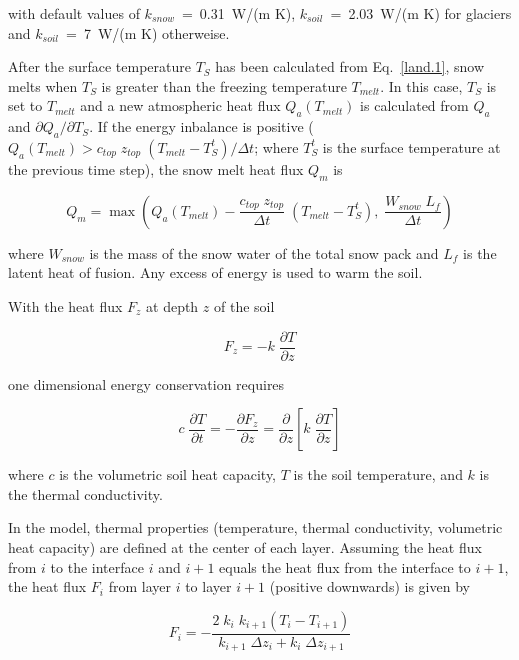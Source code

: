 with default values of $k_{snow}$~=~0.31~W/(m K),
$k_{soil}$~=~2.03~W/(m K) for
glaciers and   $k_{soil}$~=~7~W/(m K) otherweise.
 
After the surface temperature $T_S$ has been
calculated
from Eq.~\ref{land.1}, snow melts when $T_S$ is
greater than the freezing temperature $T_{melt}$. In this
case,  $T_S$ is set to $T_{melt}$ and a new atmospheric
heat
flux $Q_a(T_{melt})$ is calculated from  $Q_a$ and
$\partial Q_a/\partial T_S$. If  the energy inbalance is
positive ($Q_a(T_{melt}) >  c_{top} \; z_{top}\;  (T_{melt} -
T_S^{t})/\Delta t$; where $T_S^{t}$ is the surface
temperature at
the previous time step),  the  
snow melt heat flux $Q_m$ is

\begin{equation}\label{melt}
Q_m=\max(Q_a(T_{melt}) - \frac{c_{top} \; z_{top}}{\Delta
t} \; (T_{melt} - T_S^{t}), \; \frac{W_{snow} \; L_f}{\Delta t})
\end{equation}

where $W_{snow}$ is the mass of the snow water of
the
total snow pack and $L_f$ is the latent heat of fusion. 
Any excess of energy is used to warm the soil.


With the heat flux $F_z$ at depth $z$ of the soil 

\begin{equation}
F_z = -k \; \frac{\partial T}{\partial z}
\end{equation}

one dimensional energy conservation requires   

\begin{equation}
c\;  \frac{\partial T} {\partial t} = - \frac{\partial
F_z}{\partial
z}= \frac{\partial}{\partial z} \left [ k \; 
\frac{\partial T}{\partial z} \right]
\end{equation}

where $c$ is the volumetric soil heat capacity, $T$
is the soil temperature, and $k$ is the
thermal conductivity. 

In the model,  thermal properties (temperature,
thermal conductivity, volumetric heat capacity) are
defined at the center of each layer. Assuming the
heat flux from $i$ to the interface $i$ and $i+1$
equals the heat flux from the interface to $i+1$, the
heat flux $F_i$ from layer $i$ to layer $i+1$ 
(positive downwards) is given by 

\begin{equation}
F_i= - \frac{2\; k_i\;  k_{i+1} (T_i -
T_{i+1})}{k_{i+1} \; \Delta z_i + k_i\;  \Delta z_{i+1}}
\end{equation} 

